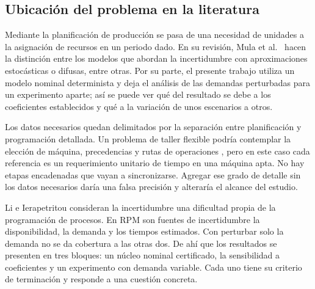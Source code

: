 \subsection{Ubicación del problema en la literatura}
Mediante la planificación de producción se pasa de una necesidad de unidades a la asignación de recursos en un periodo dado. En su revisión, Mula et al.\ \cite{mula} hacen la distinción entre los modelos que abordan la incertidumbre con aproximaciones estocásticas o difusas, entre otras. Por su parte, el presente trabajo utiliza un modelo nominal determinista y deja el análisis de las demandas perturbadas para un experimento aparte; así se puede ver qué del resultado se debe a los coeficientes establecidos y qué a la variación de unos escenarios a otros.

Los datos necesarios quedan delimitados por la separación entre planificación y programación detallada. Un problema de taller flexible podría contemplar la elección de máquina, precedencias y rutas de operaciones \cite{dauzere}, pero en este caso cada referencia es un requerimiento unitario de tiempo en una máquina apta. No hay etapas encadenadas que vayan a sincronizarse. Agregar ese grado de detalle sin los datos necesarios daría una falsa precisión y alteraría el alcance del estudio.

Li e Ierapetritou \cite{li} consideran la incertidumbre una dificultad propia de la programación de procesos. En RPM son fuentes de incertidumbre la disponibilidad, la demanda y los tiempos estimados. Con perturbar solo la demanda no se da cobertura a las otras dos. De ahí que los resultados se presenten en tres bloques: un núcleo nominal certificado, la sensibilidad a coeficientes y un experimento con demanda variable. Cada uno tiene su criterio de terminación y responde a una cuestión concreta.

